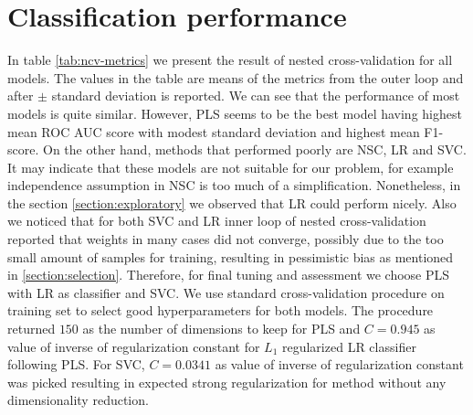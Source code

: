 \documentclass[shortabstract, english, mgr]{iithesis}
\begin{document}
\section{Classification performance}

In table \ref{tab:ncv-metrics} we present the result of nested cross-validation for all models. The values in the table are means of the metrics from the outer loop and after $\pm$ standard deviation is reported. We can see that the performance of most models is quite similar. However, PLS seems to be the best model having highest mean ROC AUC score with modest standard deviation and highest mean F1-score. On the other hand, methods that performed poorly are NSC, LR and SVC. It may indicate that these models are not suitable for our problem, for example independence assumption in NSC is too much of a simplification. Nonetheless, in the section \ref{section:exploratory} we observed that LR could perform nicely. Also we noticed that for both SVC and LR inner loop of nested cross-validation reported that weights in many cases did not converge, possibly due to the too small amount of samples for training, resulting in pessimistic bias as mentioned in \ref{section:selection}. Therefore, for final tuning and assessment we choose PLS with LR as classifier and SVC. We use standard cross-validation procedure on training set to select good hyperparameters for both models. The procedure returned $150$ as the number of dimensions to keep for PLS and $C=0.945$ as value of inverse of regularization constant for $L_1$ regularized LR classifier following PLS. For SVC, $C=0.0341$ as value of inverse of regularization constant was picked resulting in expected strong regularization for method without any dimensionality reduction.
\end{document}
